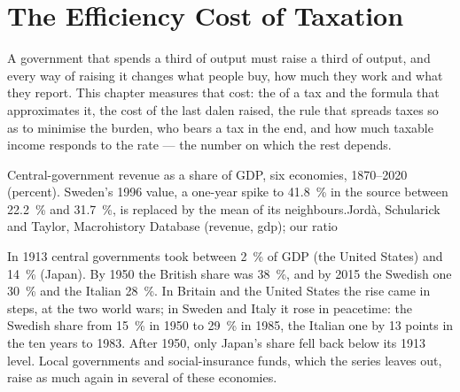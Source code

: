 \chapter{The Efficiency Cost of Taxation}\label{ch:b3:efficiency-cost-of-taxation}

A government that spends a third of output must raise a third of output, and every
way of raising it changes what people buy, how much they work and what they report.
This chapter measures that cost: the  of a tax and the formula that
approximates it, the cost of the last dalen raised, the rule that spreads taxes so
as to minimise the burden, who bears a tax in the end, and how much taxable income
responds to the rate --- the number on which the rest depends.

\begin{openingchart}{Central-government revenue as a share of GDP, six economies,
1870--2020 (percent). Sweden's 1996 value, a one-year spike to 41.8~\% in the
source between 22.2~\% and 31.7~\%, is replaced by the mean of its neighbours.}{Jordà, Schularick and Taylor, Macrohistory Database (revenue,
gdp); our ratio}
\end{openingchart}

In 1913 central governments took between 2~\% of GDP (the United States) and 14~\%
(Japan). By 1950 the British share was 38~\%, and by 2015 the Swedish one 30~\% and the
Italian 28~\%. In Britain and the United States the rise came in steps, at the two
world wars; in Sweden and Italy it rose in peacetime: the Swedish share from 15~\% in
1950 to 29~\% in 1985, the Italian one by 13 points in the ten years to 1983. After
1950, only Japan's share fell back below its 1913 level.
Local governments and social-insurance funds, which the series leaves out, raise as
much again in several of these economies.


